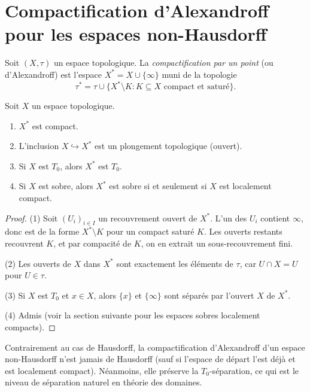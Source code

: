 \section{Compactification d'Alexandroff pour les espaces non-Hausdorff}

\begin{definition}
Soit $(X,\tau)$ un espace topologique. La \emph{compactification par un point} (ou
d'Alexandroff) est l'espace $X^* = X \cup \{\infty\}$ muni de la topologie
\[
  \tau^* = \tau \cup \{ X^* \setminus K : K \subseteq X \text{ compact et satur\'e} \}.
\]
\end{definition}

\begin{theoreme}
Soit $X$ un espace topologique.
\begin{enumerate}
  \item $X^*$ est compact.
  \item L'inclusion $X \hookrightarrow X^*$ est un plongement topologique (ouvert).
  \item Si $X$ est $T_0$, alors $X^*$ est $T_0$.
  \item Si $X$ est sobre, alors $X^*$ est sobre si et seulement si $X$ est localement compact.
\end{enumerate}
\end{theoreme}

\begin{proof}
(1) Soit $(U_i)_{i \in I}$ un recouvrement ouvert de $X^*$. L'un des $U_i$ contient
$\infty$, donc est de la forme $X^* \setminus K$ pour un compact satur\'e $K$. Les
ouverts restants recouvrent $K$, et par compacit\'e de $K$, on en extrait un
sous-recouvrement fini.

(2) Les ouverts de $X$ dans $X^*$ sont exactement les \'el\'ements de $\tau$, car
$U \cap X = U$ pour $U \in \tau$.

(3) Si $X$ est $T_0$ et $x \in X$, alors $\{x\}$ et $\{\infty\}$ sont s\'epar\'es par
l'ouvert $X$ de $X^*$.

(4) Admis (voir la section suivante pour les espaces sobres localement compacts).
\end{proof}

\begin{remarque}
Contrairement au cas de Hausdorff, la compactification d'Alexandroff d'un espace non-Hausdorff
n'est jamais de Hausdorff (sauf si l'espace de d\'epart l'est d\'ej\`a et est localement
compact). N\'eanmoins, elle pr\'eserve la $T_0$-s\'eparation, ce qui est le niveau de
s\'eparation naturel en th\'eorie des domaines.
\end{remarque}

